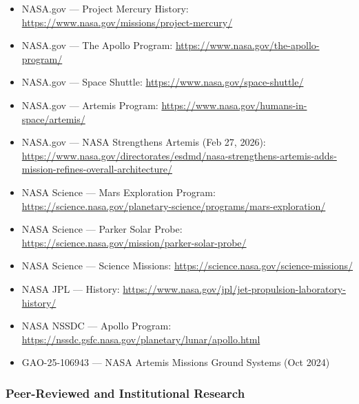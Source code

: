 \documentclass[11pt,letterpaper]{article}
\begin{document}
\begin{itemize}[leftmargin=*]
  \item NASA.gov --- Project Mercury History: \url{https://www.nasa.gov/missions/project-mercury/}
  \item NASA.gov --- The Apollo Program: \url{https://www.nasa.gov/the-apollo-program/}
  \item NASA.gov --- Space Shuttle: \url{https://www.nasa.gov/space-shuttle/}
  \item NASA.gov --- Artemis Program: \url{https://www.nasa.gov/humans-in-space/artemis/}
  \item NASA.gov --- NASA Strengthens Artemis (Feb 27, 2026): \url{https://www.nasa.gov/directorates/esdmd/nasa-strengthens-artemis-adds-mission-refines-overall-architecture/}
  \item NASA Science --- Mars Exploration Program: \url{https://science.nasa.gov/planetary-science/programs/mars-exploration/}
  \item NASA Science --- Parker Solar Probe: \url{https://science.nasa.gov/mission/parker-solar-probe/}
  \item NASA Science --- Science Missions: \url{https://science.nasa.gov/science-missions/}
  \item NASA JPL --- History: \url{https://www.nasa.gov/jpl/jet-propulsion-laboratory-history/}
  \item NASA NSSDC --- Apollo Program: \url{https://nssdc.gsfc.nasa.gov/planetary/lunar/apollo.html}
  \item GAO-25-106943 --- NASA Artemis Missions Ground Systems (Oct 2024)
\end{itemize}

\subsubsection{Peer-Reviewed and Institutional Research}
\end{document}
